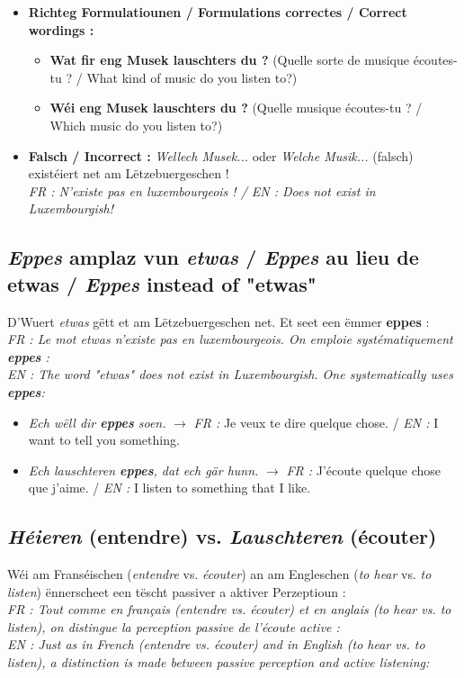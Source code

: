 \begin{itemize}
    \item \textbf{Richteg Formulatiounen / Formulations correctes / Correct wordings :}
    \begin{itemize}
        \item \textbf{Wat fir eng Musek lauschters du ?} (Quelle sorte de musique écoutes-tu ? / What kind of music do you listen to?)
        \item \textbf{Wéi eng Musek lauschters du ?} (Quelle musique écoutes-tu ? / Which music do you listen to?)
    \end{itemize}
    \item \textbf{Falsch / Incorrect :} \textit{\flqq Wellech Musek...\frqq} oder \textit{\flqq Welche Musik...\frqq} (falsch) existéiert net am Lëtzebuergeschen ! \\
    \textit{FR : N'existe pas en luxembourgeois ! / EN : Does not exist in Luxembourgish!}
\end{itemize}

\subsection{\textit{Eppes} amplaz vun \textit{\flqq etwas\frqq} / \textit{Eppes} au lieu de \flqq etwas\frqq{} / \textit{Eppes} instead of "etwas"}
D'Wuert \textit{\flqq etwas\frqq} gëtt et am Lëtzebuergeschen net. Et seet een ëmmer \textbf{eppes} : \\
\textit{FR : Le mot \flqq etwas\frqq{} n'existe pas en luxembourgeois. On emploie systématiquement \textbf{eppes} :} \\
\textit{EN : The word "etwas" does not exist in Luxembourgish. One systematically uses \textbf{eppes}:}

\begin{itemize}
    \item \textit{Ech wëll dir \textbf{eppes} soen.} $\rightarrow$ \textit{FR :} Je veux te dire quelque chose. / \textit{EN :} I want to tell you something.
    \item \textit{Ech lauschteren \textbf{eppes}, dat ech gär hunn.} $\rightarrow$ \textit{FR :} J'écoute quelque chose que j'aime. / \textit{EN :} I listen to something that I like.
\end{itemize}

\subsection{\textit{Héieren} (entendre) vs. \textit{Lauschteren} (écouter)}
Wéi am Franséischen (\textit{entendre} vs. \textit{écouter}) an am Engleschen (\textit{to hear} vs. \textit{to listen}) ënnerscheet een tëscht passiver a aktiver Perzeptioun : \\
\textit{FR : Tout comme en français (entendre vs. écouter) et en anglais (to hear vs. to listen), on distingue la perception passive de l'écoute active :} \\
\textit{EN : Just as in French (entendre vs. écouter) and in English (to hear vs. to listen), a distinction is made between passive perception and active listening:}

